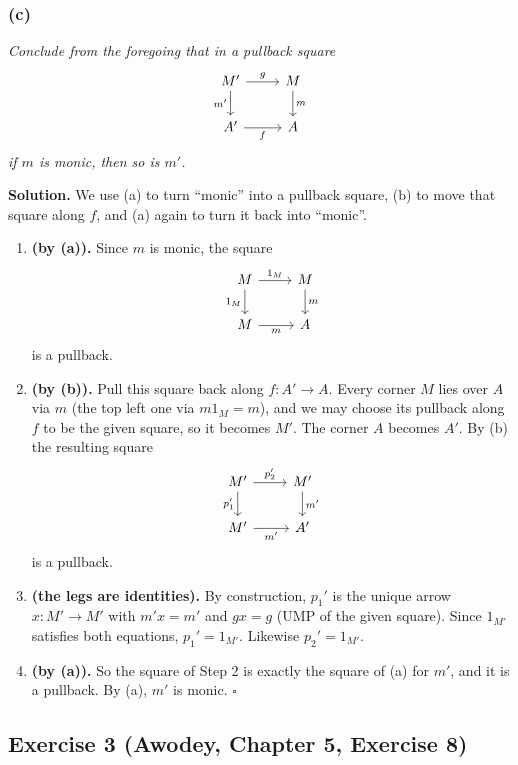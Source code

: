 \subsubsection*{(c)}

\textit{Conclude from the foregoing that in a pullback square}
\[
\begin{tikzcd}
  M' \ar[r, "g"] \ar[d, "m'"'] & M \ar[d, "m"] \\
  A' \ar[r, "f"'] & A
\end{tikzcd}
\]
\textit{if $m$ is monic, then so is $m'$.}

\medskip
\textbf{Solution.} We use (a) to turn ``monic'' into a pullback square, (b) to
move that square along $f$, and (a) again to turn it back into ``monic''.

\begin{enumerate}
  \item \textbf{(by (a)).} Since $m$ is monic, the square
    \[
      \begin{tikzcd}
        M \ar[r, "1_M"] \ar[d, "1_M"'] & M \ar[d, "m"] \\
        M \ar[r, "m"'] & A
      \end{tikzcd}
    \]
    is a pullback.
  \item \textbf{(by (b)).} Pull this square back along $f : A' \to A$. Every
    corner $M$ lies over $A$ via $m$ (the top left one via $m 1_M = m$), and we
    may choose its pullback along $f$ to be the given square, so it becomes
    $M'$. The corner $A$ becomes $A'$. By (b) the resulting square
    \[
      \begin{tikzcd}
        M' \ar[r, "p_2'"] \ar[d, "p_1'"'] & M' \ar[d, "m'"] \\
        M' \ar[r, "m'"'] & A'
      \end{tikzcd}
    \]
    is a pullback.
  \item \textbf{(the legs are identities).} By construction, $p_1'$ is the
    unique arrow $x : M' \to M'$ with $m' x = m'$ and $g x = g$ (UMP of the
    given square). Since $1_{M'}$ satisfies both equations, $p_1' = 1_{M'}$.
    Likewise $p_2' = 1_{M'}$.
  \item \textbf{(by (a)).} So the square of Step 2 is exactly the square of (a)
    for $m'$, and it is a pullback. By (a), $m'$ is monic. \hfill$\square$
\end{enumerate}


\subsection{Exercise 3 (Awodey, Chapter 5, Exercise 8)}
\label{ex:3}

